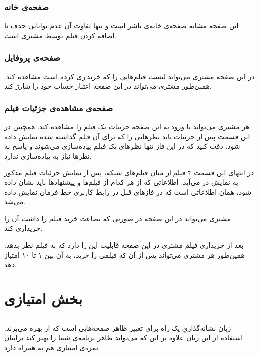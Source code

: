 \documentclass{utap}
\begin{document}
	
	
		\subsubsection{صفحه‌ی خانه}
	
	این صفحه مشابه صفحه‌ی خانه‌ی ناشر است و تنها تفاوت آن عدم توانایی حذف یا اضافه کردن فیلم توسط مشتری است. 
	
		\subsubsection{صفحه‌ی پروفایل}
		در این صفحه مشتری می‌تواند لیست فیلم‌هایی را که خریداری کرده است مشاهده کند. همین‌طور مشتری می‌تواند در این صفحه اعتبار حساب خود را شارژ کند. 
	
		\subsubsection{صفحه‌ی مشاهده‌ی جزئیات فیلم }
		
		هر مشتری می‌تواند با ورود به این صفحه جزئیات یک فیلم را مشاهده کند. همچنین در این قسمت پس از جزئیات باید نظرهایی را که برای آن فیلم گذاشته شده نمایش داده شود. دقت کنید که در این فاز تنها نظر‌های یک فیلم پیاده‌سازی می‌شوند و پاسخ به نظر‌ها نیاز به پیاده‌سازی ندارد.
		
		در  انتهای این قسمت ۴ فیلم از میان فیلم‌های شبکه، پس از نمایش جزئیات فیلم مذکور به نمایش در می‌آید. 
		اطلاعاتی که از هر کدام از فیلم‌ها و پیشنهاد‌ها باید نشان داده شود، همان اطلاعاتی است که در فاز‌های قبل در رابط کاربری خط فرمان نمایش داده می‌شد.
		
		مشتری می‌تواند در این صفحه در صورتی که بضاعت خرید فیلم را داشت آن‌ را خریداری کند. 
		
		بعد از خریداری فیلم مشتری در این صفحه قابلیت این را دارد که به فیلم نظر بدهد. همین‌طور هر مشتری می‌تواند پس از آن‌ که فیلمی را خرید، به آن بین ۱ تا ۱۰ امتیاز دهد. 
	
	
	
	
	
	
	
	
	\section{بخش امتیازی}
		\subsection{}
	زبان نشانه‌گذاریِ 
 یک راه برای تغییر ظاهر صفحه‌هایی است که از  بهره می‌برند. استفاده از این زبان علاوه بر این که می‌تواند ظاهر برنامه‌ی شما را بهتر کند برایتان نمره‌ی امتیازی هم به همراه دارد.
 
\end{document}
